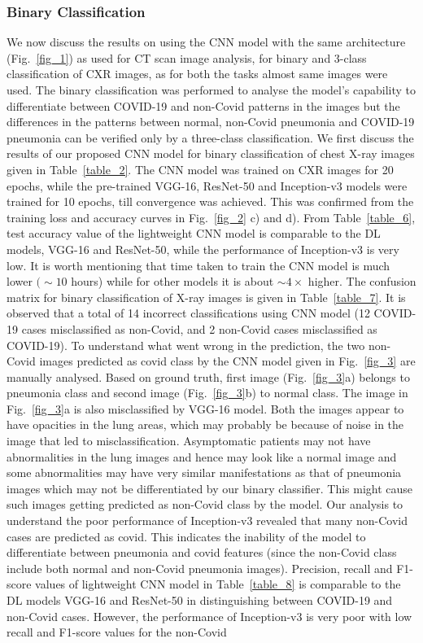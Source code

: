 \documentclass[10pt,journal,compsoc]{IEEEtran}
\begin{document}
\subsubsection{Binary Classification}
We now discuss the results on using the CNN model with the same architecture (Fig.~\ref{fig_1}) as used for CT scan image analysis, for binary and 3-class classification of CXR images, as for both the tasks almost same images were used. The binary classification was performed to analyse the model’s capability to differentiate between COVID-19 and non-Covid patterns in the images but the differences in the patterns between normal, non-Covid pneumonia and COVID-19 pneumonia can be verified only by a three-class classification. We first discuss the results of our proposed CNN model for binary classification of chest X-ray images given in Table~\ref{table_2}. The CNN model was trained on CXR images for 20 epochs, while the pre-trained VGG-16, ResNet-50 and Inception-v3 models were trained for 10 epochs, till convergence was achieved. This was confirmed from the training loss and accuracy curves in Fig.~\ref{fig_2} c) and d). From Table~\ref{table_6}, test accuracy value of the lightweight CNN model is comparable to the DL models, VGG-16 and ResNet-50, while the performance of Inception-v3 is very low. It is worth mentioning that time taken to train the CNN model is much lower \((\sim10\) hours) while for other models it is about \begin{math}\sim 4 \times\end{math} higher. The confusion matrix for binary classification of X-ray images is given in Table~\ref{table_7}. It is observed that a total of 14 incorrect classifications using CNN model (12 COVID-19 cases misclassified as non-Covid, and 2 non-Covid cases misclassified as COVID-19). To understand what went wrong in the prediction, the two non-Covid images predicted as covid class by the CNN model given in Fig.~\ref{fig_3} are manually analysed. Based on ground truth, first image (Fig.~\ref{fig_3}a) belongs to pneumonia class and second image (Fig.~\ref{fig_3}b) to normal class. The image in Fig.~\ref{fig_3}a is also misclassified by VGG-16 model. Both the images appear to have opacities in the lung areas, which may probably be because of noise in the image that led to misclassification. Asymptomatic patients may not have abnormalities in the lung images and hence may look like a normal image and some abnormalities may have very similar manifestations as that of pneumonia images which may not be differentiated by our binary classifier. This might cause such images getting predicted as non-Covid class by the model. Our analysis to understand the poor performance of Inception-v3 revealed that many non-Covid cases are predicted as covid. This indicates the inability of the model to differentiate between pneumonia and covid features (since the non-Covid class include both normal and non-Covid pneumonia images). Precision, recall and F1-score values of lightweight CNN model in Table~\ref{table_8} is comparable to the DL models VGG-16 and ResNet-50 in distinguishing between COVID-19 and non-Covid cases. However, the performance of Inception-v3 is very poor with low recall and F1-score values for the non-Covid 
\end{document}
